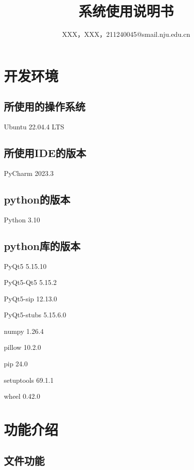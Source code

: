 \documentclass[a4paper,UTF8]{article}
\title{\textbf{系统使用说明书}}
\author{XXX，XXX，211240045@smail.nju.edu.cn}
\theoremstyle{definition}
\begin{document}
	\maketitle
	\tableofcontents 
	\newpage
	
	\section{开发环境}
	
		\subsection{所使用的操作系统}
		Ubuntu 22.04.4 LTS
	
		\subsection{所使用IDE的版本}
		PyCharm 2023.3
	
		\subsection{python的版本}
		Python 3.10
	
		\subsection{python库的版本}
		PyQt5 5.15.10
	
		PyQt5-Qt5 5.15.2
	
		PyQt5-sip 12.13.0
	
		PyQt5-stubs 5.15.6.0
	
		numpy 1.26.4
	
		pillow 10.2.0
	
		pip 24.0
	
		setuptools 69.1.1
	
		wheel 0.42.0
	
	\section{功能介绍}
		\subsection{文件功能}
\end{document}
